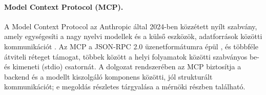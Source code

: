 \paragraph{Model Context Protocol (MCP).} A Model Context Protocol az Anthropic
által 2024-ben közzétett nyílt szabvány, amely egységesíti a nagy nyelvi
modellek és a külső eszközök, adatforrások közötti kommunikációt \cite{mcp2024}.
Az MCP a JSON-RPC 2.0 üzenetformátumra épül \cite{jsonrpc2013}, és többféle
átviteli réteget támogat, többek között a helyi folyamatok közötti szabványos
be- és kimeneti (stdio) csatornát. A dolgozat rendszerében az MCP biztosítja a
backend és a modellt kiszolgáló komponens közötti, jól strukturált
kommunikációt; e megoldás részletes tárgyalása a mérnöki részben található.

